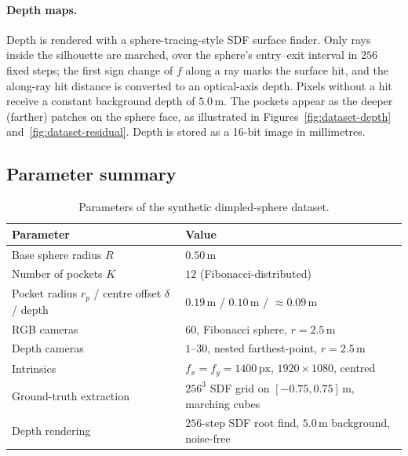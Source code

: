 \paragraph{Depth maps.} Depth is rendered with a sphere-tracing-style SDF surface finder. Only rays
inside the silhouette are marched, over the sphere's entry--exit interval in $256$ fixed steps; the
first sign change of $f$ along a ray marks the surface hit, and the along-ray hit distance is converted
to an optical-axis depth. Pixels without a hit receive a constant background depth of $5.0\,\text{m}$.
The pockets appear as the deeper (farther) patches on the sphere face, as illustrated in
Figures~\ref{fig:dataset-depth} and~\ref{fig:dataset-residual}. Depth is stored as a 16-bit image in
millimetres.

\subsection{Parameter summary}
\label{sec:dataset-params}

\begin{table}[ht]
  \centering
  \begin{tabular}{ll}
    \toprule
    Parameter & Value \\
    \midrule
    Base sphere radius $R$                    & $0.50\,\text{m}$ \\
    Number of pockets $K$                     & $12$ (Fibonacci-distributed) \\
    Pocket radius $r_p$ / centre offset $\delta$ / depth & $0.19\,\text{m}$ / $0.10\,\text{m}$ / $\approx 0.09\,\text{m}$ \\
    RGB cameras                               & $60$, Fibonacci sphere, $r = 2.5\,\text{m}$ \\
    Depth cameras                             & $1$--$30$, nested farthest-point, $r = 2.5\,\text{m}$ \\
    Intrinsics                                & $f_x = f_y = 1400\,\text{px}$, $1920\times1080$, centred \\
    Ground-truth extraction                   & $256^{3}$ SDF grid on $[-0.75,0.75]\,\text{m}$, marching cubes \\
    Depth rendering                           & $256$-step SDF root find, $5.0\,\text{m}$ background, noise-free \\
    \bottomrule
  \end{tabular}
  \caption{Parameters of the synthetic dimpled-sphere dataset.}
  \label{tab:dataset-params}
\end{table}

